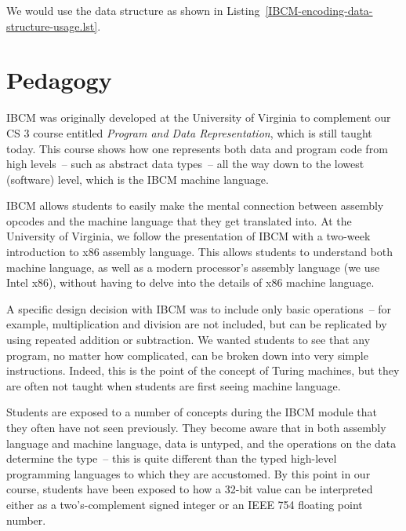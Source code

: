 \begin{figure}[h!]

\end{figure}

We would use the data structure as shown in Listing~\ref{IBCM-encoding-data-structure-usage.lst}.

\begin{figure}[h!]

\end{figure}

\section{Pedagogy}

IBCM was originally developed at the University of Virginia to
complement our CS 3 course entitled {\em Program and Data
  Representation}, which is still taught today.  This course shows how
one represents both data and program code from high levels~-- such as
abstract data types~-- all the way down to the lowest (software)
level, which is the IBCM machine language.

IBCM allows students to easily make the mental connection between
assembly opcodes and the machine language that they get translated
into.  At the University of Virginia, we follow the presentation of
IBCM with a two-week introduction to x86 assembly language.  This
allows students to understand both machine language, as well as a
modern processor's assembly language (we use Intel x86), without
having to delve into the details of x86 machine language.

A specific design decision with IBCM was to include only basic
operations~-- for example, multiplication and division are not
included, but can be replicated by using repeated addition or
subtraction.  We wanted students to see that any program, no matter
how complicated, can be broken down into very simple instructions.
Indeed, this is the point of the concept of Turing machines, but they
are often not taught when students are first seeing machine language.

Students are exposed to a number of concepts during the IBCM module
that they often have not seen previously.  They become aware that in
both assembly language and machine language, data is untyped, and the
operations on the data determine the type~-- this is quite different
than the typed high-level programming languages to which they are
accustomed.  By this point in our course, students have been exposed
to how a 32-bit value can be interpreted either as a two's-complement
signed integer or an IEEE 754 floating point number.

